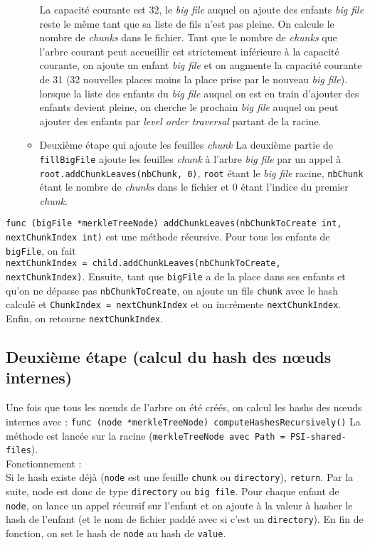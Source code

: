 \begin{itemize}
\begin{itemize}
                La capacité courante est 32, le \textit{big file} auquel on ajoute des enfants \textit{big file} reste le même tant que sa liste de fils n'est pas pleine. On calcule le nombre de \textit{chunks} dans le fichier.
                Tant que le nombre de \textit{chunks} que l'arbre courant peut accueillir est strictement inférieure à la capacité courante, on ajoute un enfant \textit{big file} et on augmente la capacité courante de 31 (32 nouvelles places moins la place prise par le nouveau \textit{big file}). lorsque la liste des enfants du \textit{big file} auquel on est en train d'ajouter des enfants devient pleine, on cherche le prochain \textit{big file} auquel on peut ajouter des enfants par \textit{level order traversal} partant de la racine.
            \item Deuxième étape qui ajoute les feuilles \textit{chunk}
                La deuxième partie de \texttt{fillBigFile} ajoute les feuilles \textit{chunk} à l'arbre \textit{big file} par un appel à \texttt{root.addChunkLeaves(nbChunk, 0)}, \texttt{root} étant le \textit{big file} racine, \texttt{nbChunk} étant le nombre de \textit{chunks} dans le fichier et 0 étant l'indice du premier \textit{chunk}.
        \end{itemize}
\end{itemize}

\texttt{func (bigFile *merkleTreeNode) addChunkLeaves(nbChunkToCreate int, nextChunkIndex int)} est une méthode récursive.
Pour tous les enfants de \texttt{bigFile}, on fait \\ \texttt{nextChunkIndex = child.addChunkLeaves(nbChunkToCreate, nextChunkIndex)}.
Ensuite, tant que \texttt{bigFile} a de la place dans ses enfants et qu'on ne dépasse pas \texttt{nbChunkToCreate}, on ajoute un fils \texttt{chunk} avec le hash calculé et \texttt{ChunkIndex = nextChunkIndex} et on incrémente \texttt{nextChunkIndex}.
Enfin, on retourne \texttt{nextChunkIndex}.

\subsection{Deuxième étape (calcul du hash des nœuds internes)}
Une fois que tous les nœuds de l'arbre on été créés, on calcul les hashs des nœuds internes avec :
\texttt{func (node *merkleTreeNode) computeHashesRecursively()}
La méthode est lancée sur la racine (\texttt{merkleTreeNode avec Path = PSI-shared-files}).\\
Fonctionnement :\\
Si le hash existe déjà (\texttt{node} est une feuille \texttt{chunk} ou \texttt{directory}), \texttt{return}.
Par la suite, node est donc de type \texttt{directory} ou \texttt{big file}.
Pour chaque enfant de \texttt{node}, on lance un appel récursif sur l'enfant et on ajoute à la valeur à hasher le hash de l'enfant (et le nom de fichier paddé avec \texttt{\0} si c'est un \texttt{directory}).
En fin de fonction, on set le hash de \texttt{node} au hash de \texttt{value}.
